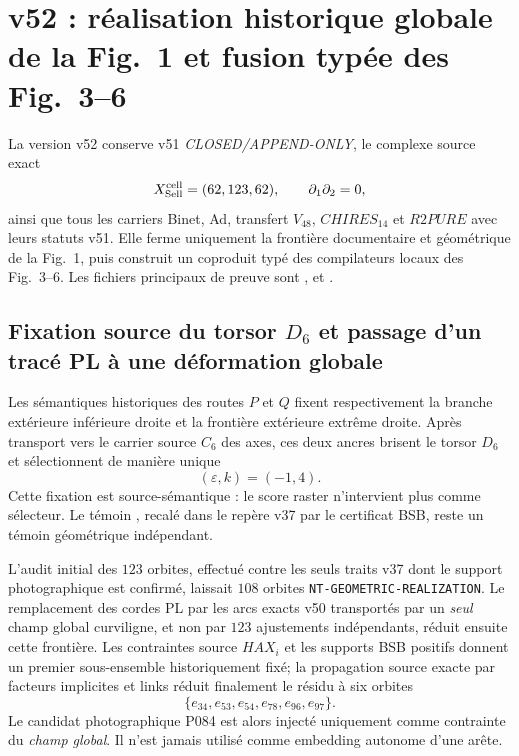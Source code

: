 
\section{v52 : réalisation historique globale de la Fig.~1 et fusion typée des Fig.~3--6}\label{sec:v52-historical-fig1-typed-fusion}

La version v52 conserve v51 \emph{CLOSED/APPEND-ONLY}, le complexe source exact
\[
 X_{\rm Sell}^{\rm cell}=(62,123,62),\qquad \partial_1\partial_2=0,
\]
ainsi que tous les carriers Binet, Ad, transfert $V_{48}$, $CHIRES_{14}$ et $R2PURE$ avec leurs statuts v51. Elle ferme uniquement la frontière documentaire et géométrique de la Fig.~1, puis construit un coproduit typé des compilateurs locaux des Fig.~3--6. Les fichiers principaux de preuve sont ,  et .

\subsection{Fixation source du torsor $D_6$ et passage d'un tracé PL à une déformation globale}

Les sémantiques historiques des routes $P$ et $Q$ fixent respectivement la branche extérieure inférieure droite et la frontière extérieure extrême droite. Après transport vers le carrier source $C_6$ des axes, ces deux ancres brisent le torsor $D_6$ et sélectionnent de manière unique
\[
 \boxed{(\varepsilon,k)=(-1,4).}
\]
Cette fixation est source-sémantique : le score raster n'intervient plus comme sélecteur. Le témoin , recalé dans le repère v37 par le certificat BSB, reste un témoin géométrique indépendant.

L'audit initial des $123$ orbites, effectué contre les seuls traits v37 dont le support photographique est confirmé, laissait $108$ orbites \texttt{NT-GEOMETRIC-REALIZATION}. Le remplacement des cordes PL par les arcs exacts v50 transportés par un \emph{seul} champ global curviligne, et non par $123$ ajustements indépendants, réduit ensuite cette frontière. Les contraintes source $HAX_i$ et les supports BSB positifs donnent un premier sous-ensemble historiquement fixé; la propagation source exacte par facteurs implicites et links réduit finalement le résidu à six orbites
\begin{equation}\label{eq:v52-residual-six}
 \boxed{\{e_{34},e_{53},e_{54},e_{78},e_{96},e_{97}\}.}
\end{equation}
Le candidat photographique P084 est alors injecté uniquement comme contrainte du \emph{champ global}. Il n'est jamais utilisé comme embedding autonome d'une arête.

